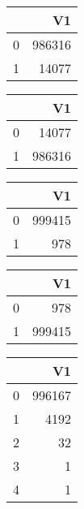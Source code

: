\bigskip\bigskip
\centering
\begin{tabular}{rr}
  \hline
 & V1 \\ 
  \hline
0 & 986316 \\ 
  1 & 14077 \\ 
   \hline
\end{tabular}

\bigskip\bigskip
\centering
\begin{tabular}{rr}
  \hline
 & V1 \\ 
  \hline
0 & 14077 \\ 
  1 & 986316 \\ 
   \hline
\end{tabular}

\bigskip\bigskip
\centering
\begin{tabular}{rr}
  \hline
 & V1 \\ 
  \hline
0 & 999415 \\ 
  1 & 978 \\ 
   \hline
\end{tabular}

\bigskip\bigskip
\centering
\begin{tabular}{rr}
  \hline
 & V1 \\ 
  \hline
0 & 978 \\ 
  1 & 999415 \\ 
   \hline
\end{tabular}

\bigskip\bigskip
\centering
\begin{tabular}{rr}
  \hline
 & V1 \\ 
  \hline
0 & 996167 \\ 
  1 & 4192 \\ 
  2 &  32 \\ 
  3 &   1 \\ 
  4 &   1 \\ 
   \hline
\end{tabular}


